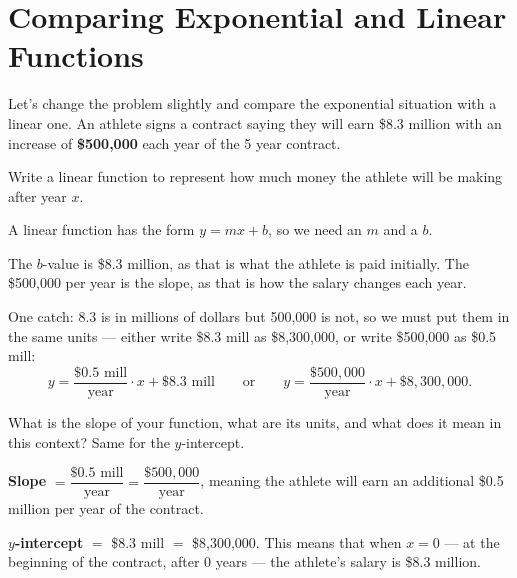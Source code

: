 \documentclass[12pt]{ximera}
\begin{document}
\section*{Comparing Exponential and Linear Functions}

Let's change the problem slightly and compare the exponential situation with a linear
one. An athlete signs a contract saying they will earn \$8.3 million with an increase of
\textbf{\$500,000} each year of the 5 year contract.

\begin{problem}
Write a linear function to represent how much money the athlete will be making after year
$x$.

\begin{freeResponse}
\end{freeResponse}

\begin{solution}
A linear function has the form $y = mx + b$, so we need an $m$ and a $b$.

The $b$-value is \$8.3 million, as that is what the athlete is paid initially. The
\$500,000 per year is the slope, as that is how the salary changes each year.

One catch: 8.3 is in millions of dollars but 500,000 is not, so we must put them in the
same units --- either write \$8.3 mill as \$8,300,000, or write \$500,000 as \$0.5 mill:
\[
y = \frac{\$0.5 \text{ mill}}{\text{year}} \cdot x + \$8.3 \text{ mill}
\qquad \text{or} \qquad
y = \frac{\$500{,}000}{\text{year}} \cdot x + \$8{,}300{,}000.
\]
\end{solution}
\end{problem}

\begin{problem}
What is the slope of your function, what are its units, and what does it mean in this
context? Same for the $y$-intercept.

\begin{freeResponse}
\end{freeResponse}

\begin{solution}
\textbf{Slope} $= \dfrac{\$0.5 \text{ mill}}{\text{year}} = \dfrac{\$500{,}000}{\text{year}}$,
meaning the athlete will earn an additional \$0.5 million per year of the contract.

\textbf{$y$-intercept} $=$ \$8.3 mill $=$ \$8,300,000. This means that when $x = 0$ ---
at the beginning of the contract, after 0 years --- the athlete's salary is \$8.3 million.
\end{solution}
\end{problem}
\end{document}

